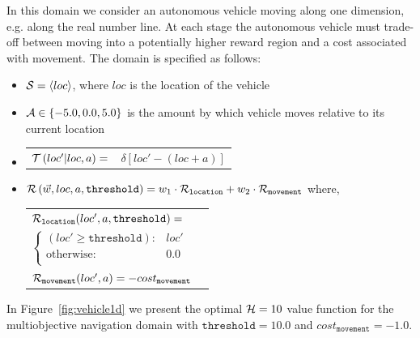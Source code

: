 In this domain we consider an autonomous vehicle moving along one dimension, e.g. along the real number line. At each stage the autonomous vehicle must trade-off between moving into a potentially higher reward region and a cost associated with movement. The domain is specified as follows:
\begin{itemize}
    \item {\footnotesize $ \mathcal{S} = \left\langle loc \right\rangle$}, where $ loc $ is the location of the vehicle
    \item {\footnotesize $ \mathcal{A} \in \left\lbrace -5.0, 0.0, 5.0 \right\rbrace $} is the amount by which vehicle moves relative to its current location
    \item {\footnotesize 
        \abovedisplayskip=5pt
        \belowdisplayskip=0pt
        \renewcommand{\arraystretch}{1.5}
        \begin{tabular}{ll}
            $ \mathcal{T}\left( loc' | loc, a \right) =$ & $ \delta \left[ loc' - (loc + a) \right] $ \\
        \end{tabular}
    }%
    \item {\footnotesize $ \mathcal{R}\left(\vec{w}, loc, a, \mathtt{threshold} \right) = w_1 \cdot \mathcal{R}_{\mathtt{location}} + w_2 \cdot \mathcal{R}_{\mathtt{movement}} $} where, \\
    {\footnotesize 
        \abovedisplayskip=10pt
        \belowdisplayskip=0pt
        \renewcommand{\arraystretch}{1.5}
        \begin{tabular}{ll}    
            $ \mathcal{R}_{\mathtt{location}}(loc', a, \mathtt{threshold}) = $ &  $ $ \\
                \qquad $ \begin{cases}
                (loc' \geq \mathtt{threshold}) : & loc' \\
                \text{otherwise} : & 0.0 \\
                \end{cases} $ & $ $\\
            $ \mathcal{R}_{\mathtt{movement}}(loc', a) = -cost_{\mathtt{movement}} $ & $ $ \\                        
        \end{tabular}
    }    
\end{itemize} 

In Figure~\ref{fig:vehicle1d} we present the optimal $ \mathcal{H} = 10 $ value function for the multiobjective navigation domain with $ \mathtt{threshold} = 10.0 $ and $ cost_{\mathtt{movement}} = -1.0 $.

